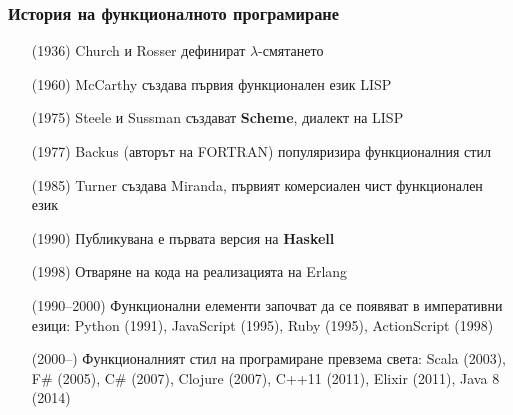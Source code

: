 \documentclass{beamer}
\begin{document}
\begin{frame}
  \frametitle{История на функционалното програмиране}

  \setlength{\leftmargini}{11ex}
  \begin{itemize}[<+->]
  \item[(1936)] Church и Rosser дефинират $\lambda$-смятането
  \item[(1960)] McCarthy създава първия функционален език LISP
  \item[(1975)] Steele и Sussman създават \textbf{Scheme}, диалект на LISP
  \item[(1977)] Backus (авторът на FORTRAN) популяризира функционалния стил
  \item[(1985)] Turner създава Miranda, първият комерсиален чист функционален език
  \item[(1990)] Публикувана е първата версия на \textbf{Haskell}
  \item[(1998)] Отваряне на кода на реализацията на Erlang
  \item[(1990--2000)] Функционални елементи започват да се появяват в императивни езици: Python (1991), JavaScript (1995), Ruby (1995), ActionScript (1998)
  \item[(2000--)] Функционалният стил на програмиране превзема света: Scala (2003), F\# (2005), C\# (2007), Clojure (2007), C++11 (2011), Elixir (2011), Java 8 (2014)
  \end{itemize}
\end{frame}
\end{document}
